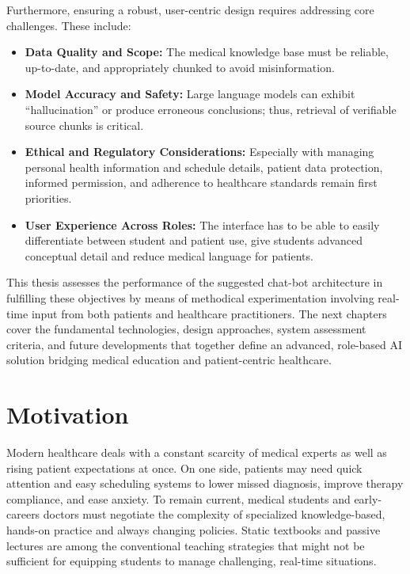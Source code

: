 \noindent Furthermore, ensuring a robust, user-centric design requires addressing core challenges. These include:
\begin{itemize}[itemsep=2em]
    \item \textbf{Data Quality and Scope:} The medical knowledge base must be reliable, up-to-date, and appropriately chunked to avoid misinformation.
    \item \textbf{Model Accuracy and Safety:} Large language models can exhibit “hallucination” or produce erroneous conclusions; thus, retrieval of verifiable source chunks is critical.
    \item \textbf{Ethical and Regulatory Considerations:} Especially with managing personal health information and schedule details, patient data protection, informed permission, and adherence to healthcare standards remain first priorities.
    \item \textbf{User Experience Across Roles:} The interface has to be able to easily differentiate between student and patient use, give students advanced conceptual detail and reduce medical language for patients.
\end{itemize}

\noindent This thesis assesses the performance of the suggested chat-bot architecture in fulfilling these objectives by means of methodical experimentation involving real-time input from both patients and healthcare practitioners. The next chapters cover the fundamental technologies, design approaches, system assessment criteria, and future developments that together define an advanced, role-based AI solution bridging medical education and patient-centric healthcare.


\section{Motivation}
\label{sec:motivation}

Modern healthcare deals with a constant scarcity of medical experts as well as rising patient expectations at once.  On one side, patients may need quick attention and easy scheduling systems to lower missed diagnosis, improve therapy compliance, and ease anxiety.  To remain current, medical students and early-careers doctors must negotiate the complexity of specialized knowledge-based, hands-on practice and always changing policies.  Static textbooks and passive lectures are among the conventional teaching strategies that might not be sufficient for equipping students to manage challenging, real-time situations.


